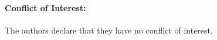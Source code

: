 \documentclass[smallcondensed]{svjour3}     %
\begin{document}
\paragraph{Conflict of Interest:} The authors declare that they have no conflict of interest.


%
%
%
% 









\end{document}
